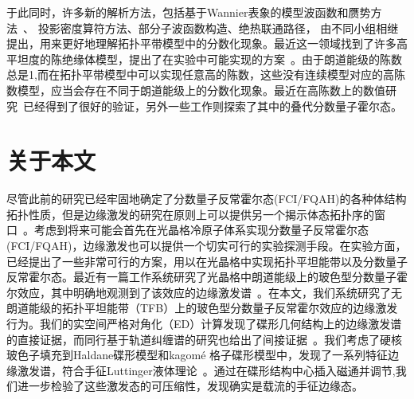 于此同时，许多新的解析方法，包括基于Wannier表象的模型波函数和赝势方法~\cite{Qi2011,Barkeshli2012a,Wu2013,Lee2013,Jian2013}、 投影密度算符方法\cite{Parameswaran2011,Goerbig2012,Murthy2011,Murthy2012}、部分子波函数构造\cite{Lu2012,McGreevy2012,Zhang2013}、绝热联通路径\cite{Scaffidi2012,Wu2012a,Liu2013}，
由不同小组相继提出，用来更好地理解拓扑平带模型中的分数化现象。最近这一领域找到了许多高平坦度的陈绝缘体模型，提出了在实验中可能实现的方案~\cite{Liu2013a,Cooper2013,Shi2013,Yannopapas2012,Zhang2013a,Grushin2012,Trescher2012,Chen2012,Weeks2012,Hu2011,Venderbos2011,Ghaemi2012,Wang2011a,Venderbos2012,Liu2012a,Yang2012,Xiao2011,Yao2013}。由于朗道能级的陈数总是1,而在拓扑平带模型中可以实现任意高的陈数，这些没有连续模型对应的高陈数模型，应当会存在不同于朗道能级上的分数化现象。最近在高陈数上的数值研究~\cite{Wang2012,Liu2012,Sterdyniak2013}已经得到了很好的验证，另外一些工作则探索了其中的叠代分数量子霍尔态\cite{Liu2013b,Lauchli2013}。





\section{关于本文}
尽管此前的研究已经牢固地确定了分数量子反常霍尔态(FCI/FQAH)的各种体结构拓扑性质，但是边缘激发的研究在原则上可以提供另一个揭示体态拓扑序的窗口~\cite{Wen1995}。考虑到将来可能会首先在光晶格冷原子体系实现分数量子反常霍尔态(FCI/FQAH)，边缘激发也可以提供一个切实可行的实验探测手段。在实验方面，已经提出了一些非常可行的方案，用以在光晶格中实现拓扑平坦能带以及分数量子反常霍尔态。最近有一篇工作系统研究了光晶格中朗道能级上的玻色型分数量子霍尔效应，其中明确地观测到了该效应的边缘激发谱~\cite{Kjall2012}。在本文，我们系统研究了无朗道能级的拓扑平坦能带（TFB）上的玻色型分数量子反常霍尔效应的边缘激发行为。我们的实空间严格对角化（ED）计算发现了碟形几何结构上的边缘激发谱的直接证据，而同行基于轨道纠缠谱的研究也给出了间接证据~\cite{Liu2013c}。我们考虑了硬核玻色子填充到Haldane碟形模型和kagom\'{e} 格子碟形模型中，发现了一系列特征边缘激发谱，符合手征Luttinger液体理论~\cite{Wen1995}。通过在碟形结构中心插入磁通并调节,我们进一步检验了这些激发态的可压缩性，发现确实是载流的手征边缘态。

